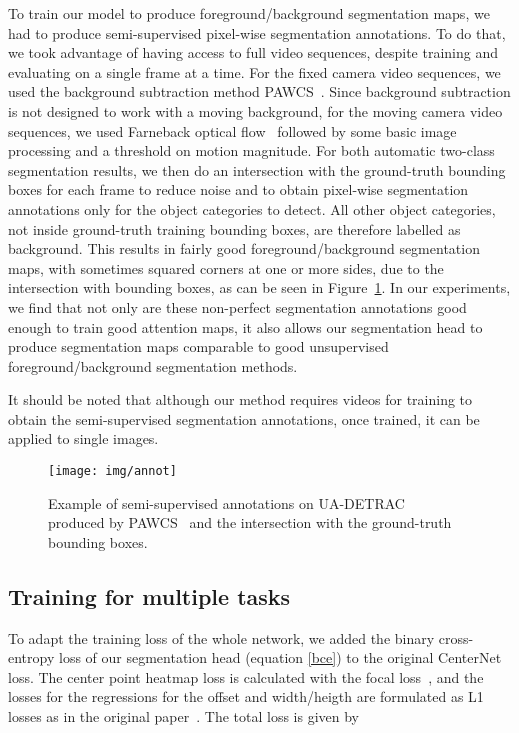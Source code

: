 \documentclass[10pt, conference, compsocconf]{IEEEtran}
\begin{document}
To train our model to produce foreground/background segmentation maps, we had to produce semi-supervised pixel-wise segmentation annotations. To do that, we took advantage of having access to full video sequences, despite training and evaluating on a single frame at a time. For the fixed camera video sequences, we used the background subtraction method PAWCS~\cite{st2015self_pawcs}. Since background subtraction is not designed to work with a moving background, for the moving camera video sequences, we used Farneback optical flow~\cite{farneback2003two} followed by some basic image processing and a threshold on motion magnitude. For both automatic two-class segmentation results, we then do an intersection with the ground-truth bounding boxes for each frame to reduce noise and to obtain pixel-wise segmentation annotations only for the object categories to detect. All other object categories, not inside ground-truth training bounding boxes, are therefore labelled as background. This results in fairly good foreground/background segmentation maps, with sometimes squared corners at one or more sides, due to the intersection with bounding boxes, as can be seen in Figure~\ref{annot}. In our experiments, we find that not only are these non-perfect segmentation annotations good enough to train good attention maps, it also allows our segmentation head to produce segmentation maps comparable to good unsupervised foreground/background segmentation methods. 

It should be noted that although our method requires videos for training to obtain the semi-supervised segmentation annotations, once trained, it can be applied to single images. 

\begin{figure}[ht]
\begin{center}
\texttt{[image: img/annot]}
\end{center}
   \caption{Example of semi-supervised annotations on UA-DETRAC~\cite{Wen2015Tracking} produced by PAWCS~\cite{st2015self_pawcs} and the intersection with the ground-truth bounding boxes.}
\label{annot}
\end{figure}

\subsection{Training for multiple tasks}

To adapt the training loss of the whole network, we added the binary cross-entropy loss of our segmentation head (equation \ref{bce}) to the original CenterNet loss. The center point heatmap loss  is calculated with the focal loss~\cite{lin2018focal}, and the losses for the regressions for the offset  and width/heigth  are formulated as L1 losses as in the original paper~\cite{zhou2019objectsaspoints}. The total loss  is given by
\end{document}
